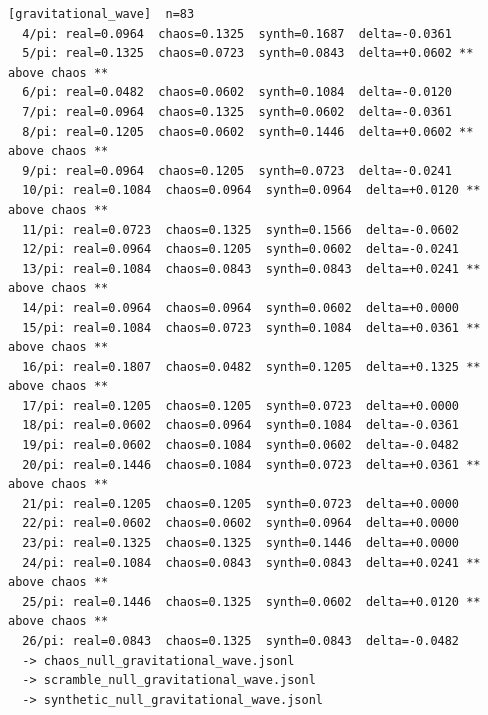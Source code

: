 \documentclass[11pt, letterpaper, openany]{book}
\begin{document}
\begin{empiricalbox}
\begin{lstlisting}[style=terminal]
[gravitational_wave]  n=83
  4/pi: real=0.0964  chaos=0.1325  synth=0.1687  delta=-0.0361
  5/pi: real=0.1325  chaos=0.0723  synth=0.0843  delta=+0.0602 ** above chaos **
  6/pi: real=0.0482  chaos=0.0602  synth=0.1084  delta=-0.0120
  7/pi: real=0.0964  chaos=0.1325  synth=0.0602  delta=-0.0361
  8/pi: real=0.1205  chaos=0.0602  synth=0.1446  delta=+0.0602 ** above chaos **
  9/pi: real=0.0964  chaos=0.1205  synth=0.0723  delta=-0.0241
  10/pi: real=0.1084  chaos=0.0964  synth=0.0964  delta=+0.0120 ** above chaos **
  11/pi: real=0.0723  chaos=0.1325  synth=0.1566  delta=-0.0602
  12/pi: real=0.0964  chaos=0.1205  synth=0.0602  delta=-0.0241
  13/pi: real=0.1084  chaos=0.0843  synth=0.0843  delta=+0.0241 ** above chaos **
  14/pi: real=0.0964  chaos=0.0964  synth=0.0602  delta=+0.0000
  15/pi: real=0.1084  chaos=0.0723  synth=0.1084  delta=+0.0361 ** above chaos **
  16/pi: real=0.1807  chaos=0.0482  synth=0.1205  delta=+0.1325 ** above chaos **
  17/pi: real=0.1205  chaos=0.1205  synth=0.0723  delta=+0.0000
  18/pi: real=0.0602  chaos=0.0964  synth=0.1084  delta=-0.0361
  19/pi: real=0.0602  chaos=0.1084  synth=0.0602  delta=-0.0482
  20/pi: real=0.1446  chaos=0.1084  synth=0.0723  delta=+0.0361 ** above chaos **
  21/pi: real=0.1205  chaos=0.1205  synth=0.0723  delta=+0.0000
  22/pi: real=0.0602  chaos=0.0602  synth=0.0964  delta=+0.0000
  23/pi: real=0.1325  chaos=0.1325  synth=0.1446  delta=+0.0000
  24/pi: real=0.1084  chaos=0.0843  synth=0.0843  delta=+0.0241 ** above chaos **
  25/pi: real=0.1446  chaos=0.1325  synth=0.0602  delta=+0.0120 ** above chaos **
  26/pi: real=0.0843  chaos=0.1325  synth=0.0843  delta=-0.0482
  -> chaos_null_gravitational_wave.jsonl
  -> scramble_null_gravitational_wave.jsonl
  -> synthetic_null_gravitational_wave.jsonl


\end{lstlisting}
\end{empiricalbox}
\end{document}
